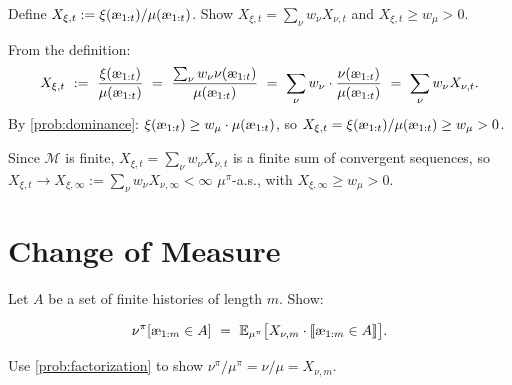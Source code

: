 \documentclass[fontsize=11pt, parskip=half]{scrartcl}
\newcommand{\cM}{\mathcal{M}}
\newcommand{\Ex}{\mathbb{E}}
\newcommand{\aes}{\textnormal{\ae}}
\begin{document}
\begin{exercise}
\label{prob:X_bounded_mu}
Define $X_{\xi,t} := \xi(\aes_{1:t})/\mu(\aes_{1:t})$. 
Show $X_{\xi,t} = \sum_\nu w_\nu X_{\nu,t}$ and $X_{\xi,t} \geq w_\mu > 0$.

\end{exercise}

\begin{solution}
From the definition:
\[
    X_{\xi,t}
    ~:=~ \frac{\xi(\aes_{1:t})}{\mu(\aes_{1:t})}
    ~=~ \frac{\sum_\nu w_\nu \nu(\aes_{1:t})}{\mu(\aes_{1:t})}
    ~=~ \sum_\nu w_\nu \cdot \frac{\nu(\aes_{1:t})}{\mu(\aes_{1:t})}
    ~=~ \sum_\nu w_\nu X_{\nu,t}.
\]
By \cref{prob:dominance}: $\xi(\aes_{1:t}) \geq w_\mu \cdot \mu(\aes_{1:t})$, so $X_{\xi,t} = \xi(\aes_{1:t})/\mu(\aes_{1:t}) \geq w_\mu > 0$.

Since $\cM$ is finite, $X_{\xi,t} = \sum_\nu w_\nu X_{\nu,t}$ is a finite sum of convergent sequences, so $X_{\xi,t} \to X_{\xi,\infty} := \sum_\nu w_\nu X_{\nu,\infty} < \infty$ $\mu^\pi$-a.s., with $X_{\xi,\infty} \geq w_\mu > 0$.
\end{solution}


\section{Change of Measure}\label{prob:change_measure}

\begin{exercise}
\label{prob:cm_finite}
Let $A$ be a set of finite histories of length $m$. Show:

\[
    \nu^\pi[\aes_{1:m} \in A] ~=~ \Ex_{\mu^\pi}\big[X_{\nu,m} \cdot \llbracket \aes_{1:m} \in A \rrbracket\big].
\]
\begin{hint}
Use \cref{prob:factorization} to show $\nu^\pi/\mu^\pi = \nu/\mu = X_{\nu,m}$.
\end{hint}
\end{exercise}
\end{document}
